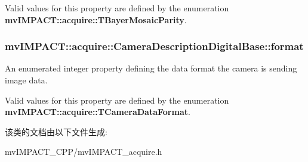 Valid values for this property are defined by the enumeration {\bfseries mv\+I\+M\+P\+A\+C\+T\+::acquire\+::\+T\+Bayer\+Mosaic\+Parity}. \hypertarget{classmv_i_m_p_a_c_t_1_1acquire_1_1_camera_description_digital_base_a06cbe37a9a07831b908c66df54026fc5}{
\subsubsection[{format}]{ mv\+I\+M\+P\+A\+C\+T\+::acquire\+::\+Camera\+Description\+Digital\+Base\+::format}}\label{classmv_i_m_p_a_c_t_1_1acquire_1_1_camera_description_digital_base_a06cbe37a9a07831b908c66df54026fc5}


An enumerated integer property defining the data format the camera is sending image data. 

Valid values for this property are defined by the enumeration {\bfseries mv\+I\+M\+P\+A\+C\+T\+::acquire\+::\+T\+Camera\+Data\+Format}. 

该类的文档由以下文件生成\+:\begin{DoxyCompactItemize}
\item 
mv\+I\+M\+P\+A\+C\+T\+\_\+\+C\+P\+P/mv\+I\+M\+P\+A\+C\+T\+\_\+acquire.\+h\end{DoxyCompactItemize}
